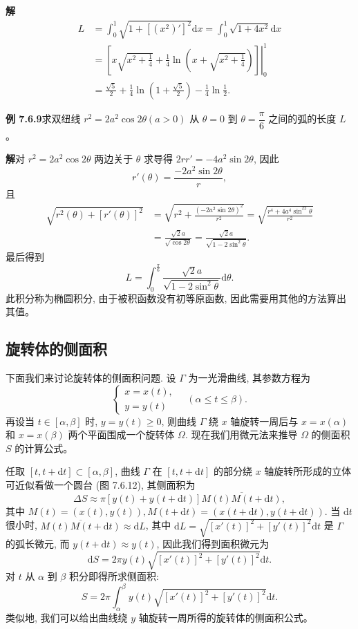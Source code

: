 \documentclass[UTF8, 12pt, fontset=fandol, oneside]{ctexart}
\begin{document}
\noindent\textbf{解}\quad
\[
\begin{aligned}
  L&=\int_0^1\sqrt{1+[(x^2)']^2}\mathrm dx
  =\int_0^1\sqrt{1+4x^2}\mathrm dx\\
  &=\left.\left[x\sqrt{x^2+\frac{1}{4}}
  +\frac{1}{4}\ln\left(x+\sqrt{x^2+\frac{1}{4}}\right)\right]\right|_0^1\\
  &=\frac{\sqrt5}{2}+\frac{1}{4}\ln\left(1+\frac{\sqrt5}{2}\right)-\frac{1}{4}\ln\frac{1}{2}.
\end{aligned}
\]

\noindent\textbf{例 7.6.9}\quad 求双纽线 $r^2=2a^2\cos2\theta(a>0)$ 从 $\theta=0$ 到 $\theta=\dfrac{\pi}{6}$ 之间的弧的长度 $L$。

\noindent\textbf{解}\quad 对 $r^2=2a^2\cos2\theta$ 两边关于 $\theta$ 求导得 $2rr'=-4a^2\sin2\theta$, 因此
\[
  r'(\theta)=\frac{-2a^2\sin2\theta}{r},
\]
且
\[
\begin{aligned}
  \sqrt{r^2(\theta)+[r'(\theta)]^2}
  &=\sqrt{r^2+\frac{(-2a^2\sin2\theta)^2}{r^2}}
  =\sqrt{\frac{r^4+4a^4\sin^22\theta}{r^2}}\\
  &=\frac{\sqrt2a}{\sqrt{\cos2\theta}}
  =\frac{\sqrt2a}{\sqrt{1-2\sin^2\theta}}.
\end{aligned}
\]
最后得到
\[
  L=\int_0^{\frac{\pi}{6}}\frac{\sqrt2a}{\sqrt{1-2\sin^2\theta}}\mathrm d\theta.
\]
此积分称为椭圆积分, 由于被积函数没有初等原函数, 因此需要用其他的方法算出其值。

\subsection{旋转体的侧面积}

下面我们来讨论旋转体的侧面积问题. 设 $\Gamma$ 为一光滑曲线, 其参数方程为
\[
  \begin{cases}
    x=x(t),\\
    y=y(t)
  \end{cases}
  \quad(\alpha\leq t\leq\beta).
\]
再设当 $t\in[\alpha,\beta]$ 时, $y=y(t)\geq0$, 则曲线 $\Gamma$ 绕 $x$ 轴旋转一周后与 $x=x(\alpha)$ 和 $x=x(\beta)$ 两个平面围成一个旋转体 $\Omega$. 现在我们用微元法来推导 $\Omega$ 的侧面积 $S$ 的计算公式。

任取 $[t,t+\mathrm dt]\subset[\alpha,\beta]$, 曲线 $\Gamma$ 在 $[t,t+\mathrm dt]$ 的部分绕 $x$ 轴旋转所形成的立体可近似看做一个圆台 (图 7.6.12), 其侧面积为
\[
  \Delta S\approx\pi[y(t)+y(t+\mathrm dt)]\overline{M(t)M(t+\mathrm dt)},
\]
其中 $M(t)=(x(t),y(t)),M(t+\mathrm dt)=(x(t+\mathrm dt),y(t+\mathrm dt))$. 当 $\mathrm dt$ 很小时, $\overline{M(t)M(t+\mathrm dt)}\approx\mathrm dL$, 其中 $\mathrm dL=\sqrt{[x'(t)]^2+[y'(t)]^2}\mathrm dt$ 是 $\Gamma$ 的弧长微元, 而 $y(t+\mathrm dt)\approx y(t)$, 因此我们得到面积微元为
\[
  \mathrm dS=2\pi y(t)\sqrt{[x'(t)]^2+[y'(t)]^2}\mathrm dt.
\]
对 $t$ 从 $\alpha$ 到 $\beta$ 积分即得所求侧面积:
\[
  S=2\pi\int_\alpha^\beta y(t)\sqrt{[x'(t)]^2+[y'(t)]^2}\mathrm dt.
\]
类似地, 我们可以给出曲线绕 $y$ 轴旋转一周所得的旋转体的侧面积公式。
\end{document}
